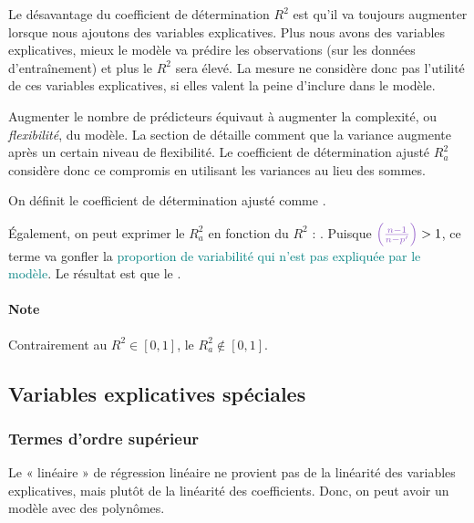 \documentclass[french]{article}
\begin{document}
\begin{multicols*}{2}
\begin{definitionNOHFILL}
\begin{rappel_enhanced}[Contexte]
Le désavantage du coefficient de détermination $R^{2}$ est qu'il va toujours augmenter lorsque nous ajoutons des variables explicatives. Plus nous avons des variables explicatives, mieux le modèle va prédire les observations (sur les données d'entraînement) et plus le $R^{2}$ sera élevé. La mesure ne considère donc pas l'utilité de ces variables explicatives, si elles valent la peine d'inclure dans le modèle.

\bigskip

Augmenter le nombre de prédicteurs équivaut à augmenter la complexité, ou \textit{flexibilité}, du modèle. La section de \textit{\underline{}} détaille comment que la variance augmente après un certain niveau de flexibilité. Le coefficient de détermination ajusté $R^{2}_{a}$ considère donc ce compromis en utilisant les variances au lieu des sommes. 
\end{rappel_enhanced}

On définit le coefficient de détermination ajusté comme .

\bigskip

Également, on peut exprimer le $R^{2}_{a}$ en fonction du $R^{2}$ : . Puisque $\textcolor{amethyst}{\left(\frac{n - 1}{n - p'}\right)} > 1$,  ce terme va \textcolor{amethyst}{gonfler} la \textcolor{teal}{proportion de variabilité qui n'est pas expliquée par le modèle}. Le résultat est que le .

\paragraph{Note}	Contrairement au $R^{2} \in [0, 1]$, le $R^{2}_{a} \not\in [0, 1]$.
\end{definitionNOHFILL}




\columnbreak
\subsection{Variables explicatives spéciales}
\subsubsection{Termes d'ordre supérieur}
\begin{rappel_enhanced}[Contexte]
Le « linéaire » de régression linéaire ne provient pas de la linéarité des variables explicatives, mais plutôt de la linéarité des coefficients. Donc, on peut avoir un modèle avec des polynômes.
\end{rappel_enhanced}


\end{multicols*}
\end{document}
